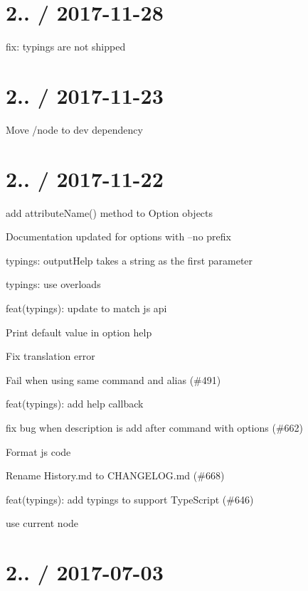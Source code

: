\section*{2.. / 2017-\/11-\/28 }


\begin{DoxyItemize}
\item fix\+: typings are not shipped
\end{DoxyItemize}

\section*{2.. / 2017-\/11-\/23 }


\begin{DoxyItemize}
\item Move /node to dev dependency
\end{DoxyItemize}

\section*{2.. / 2017-\/11-\/22 }


\begin{DoxyItemize}
\item add attribute\+Name() method to Option objects
\item Documentation updated for options with --no prefix
\item typings\+: {\ttfamily output\+Help} takes a string as the first parameter
\item typings\+: use overloads
\item feat(typings)\+: update to match js api
\item Print default value in option help
\item Fix translation error
\item Fail when using same command and alias (\#491)
\item feat(typings)\+: add help callback
\item fix bug when description is add after command with options (\#662)
\item Format js code
\item Rename History.\+md to C\+H\+A\+N\+G\+E\+L\+O\+G.\+md (\#668)
\item feat(typings)\+: add typings to support Type\+Script (\#646)
\item use current node
\end{DoxyItemize}

\section*{2.. / 2017-\/07-\/03 }


